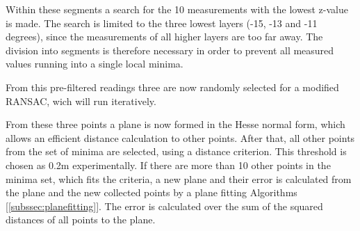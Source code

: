 \documentclass[11pt,oneside,openright]{mpreport}
\begin{document}



Within these segments a search for the 10 measurements with the lowest z-value is made. The search is limited to the three lowest layers (-15, -13 and -11 degrees),
since the measurements of all higher layers are too far away. The division into segments is therefore necessary in order to prevent all measured values running into a single local minima. 


From this pre-filtered readings three are now randomly selected for a modified \ac{RANSAC}, wich will run iteratively.

From these three points a plane is now formed in the Hesse normal form, which allows an efficient distance calculation to other points.
After that, all other points from the set of minima are selected, using a distance criterion. This threshold is chosen as 0.2m experimentally.
If there are more than 10 other points in the minima set, which fits the criteria, a new plane and their error is calculated from the plane and
the new collected points by a plane fitting Algorithms [\cref{subssec:planefitting}].
The error is calculated over the sum of the squared distances of all points to the plane.
\end{document}
